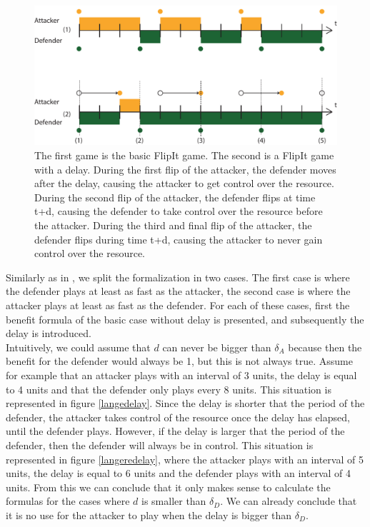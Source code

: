 \begin{figure}[hbtp]
\centering
\includegraphics[scale=0.7]{Images/Delayuitgelegd.pdf}
\caption{The first game is the basic FlipIt game. The second is a FlipIt game with a delay. During the first flip of the attacker, the defender moves after the delay, causing the attacker to get control over the resource. During the second flip of the attacker, the defender flips at time t+d, causing the defender to take control over the resource before the attacker. During the third and final flip of the attacker, the defender flips during time t+d, causing the attacker to never gain control over the resource. }
\label{dt}
\end{figure}

Similarly as in \cite{FlipIt}, we split the formalization in two cases. The first case is where the defender plays at least as fast as the attacker, the second case is where the attacker plays at least as fast as the defender. For each of these cases, first the benefit formula of the basic case without delay is presented, and subsequently the delay is introduced.  \\

Intuitively, we could assume that $d$ can never be bigger than $\delta_{A}$ because then the benefit for the defender would always be 1, but this is not always true. Assume for example that an attacker plays with an interval of 3 units, the delay is equal to 4 units and that the defender only plays every 8 units. This situation is represented in figure \ref{langedelay}. Since the delay is shorter that the period of the defender, the attacker takes control of the resource once the delay has elapsed, until the defender plays. However, if the delay is larger that the period of the defender, then the defender will always be in control. This situation is represented in figure \ref{langeredelay}, where the attacker plays with an interval of 5 units, the delay is equal to 6 units and the defender plays with an interval of 4 units. From this we can conclude that it only makes sense to calculate the formulas for the cases where $d$ is smaller than $\delta_{D}$. We can already conclude that it is no use for the attacker to play when the delay is bigger than $\delta_{D}$. 




